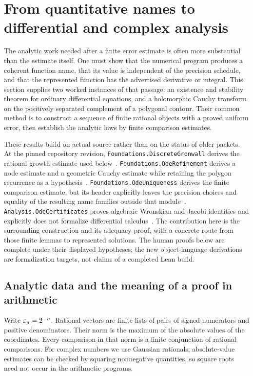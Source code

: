 \section{From quantitative names to differential and complex analysis}
\label{sec:analytic-realization}

The analytic work needed after a finite error estimate is often more substantial than the estimate itself.  One must show that the numerical program produces a coherent function name, that its value is independent of the precision schedule, and that the represented function has the advertised derivative or integral.  This section supplies two worked instances of that passage: an existence and stability theorem for ordinary differential equations, and a holomorphic Cauchy transform on the positively separated complement of a polygonal contour.  Their common method is to construct a sequence of finite rational objects with a proved uniform error, then establish the analytic laws by finite comparison estimates.

These results build on actual source rather than on the status of older packets.  At the pinned repository revision, \texttt{Foundations.DiscreteGronwall} derives the rational growth estimate used below~\cite{repo-gronwall}.  \texttt{Foundations.OdeRefinement} derives a node estimate and a geometric Cauchy estimate while retaining the polygon recurrence as a hypothesis~\cite{repo-ode-refinement}.  \texttt{Foundations.OdeUniqueness} derives the finite comparison estimate, but its header explicitly leaves the precision choices and equality of the resulting name families outside that module~\cite{repo-ode-uniqueness}.  \texttt{Analysis.OdeCertificates} proves algebraic Wronskian and Jacobi identities and explicitly does not formalize differential calculus~\cite{repo-ode-certificates}.  The contribution here is the surrounding construction and its adequacy proof, with a concrete route from those finite lemmas to represented solutions.  The human proofs below are complete under their displayed hypotheses; the new object-language derivations are formalization targets, not claims of a completed Lean build.

\subsection{Analytic data and the meaning of a proof in arithmetic}

Write $\varepsilon_n=2^{-n}$.  Rational vectors are finite lists of pairs of signed numerators and positive denominators.  Their norm is the maximum of the absolute values of the coordinates.  Every comparison in that norm is a finite conjunction of rational comparisons.  For complex numbers we use Gaussian rationals; absolute-value estimates can be checked by squaring nonnegative quantities, so square roots need not occur in the arithmetic programs.

